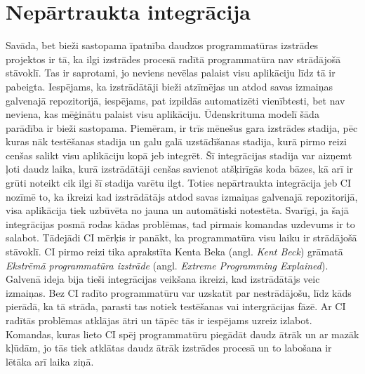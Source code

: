 \section{Nepārtraukta integrācija}
Savāda, bet bieži sastopama īpatnība daudzos programmatūras izstrādes projektos ir tā, ka ilgi izstrādes procesā radītā programmatūra nav strādājošā stāvoklī. Tas ir saprotami, jo neviens nevēlas palaist visu aplikāciju līdz tā ir pabeigta. Iespējams, ka izstrādātāji bieži atzīmējas un atdod savas izmaiņas galvenajā repozitorijā, iespējams, pat izpildās automatizēti vienībtesti, bet nav neviena, kas mēģinātu palaist visu aplikāciju. Ūdenskrituma modelī šāda parādība ir bieži sastopama. Piemēram, ir trīs mēnešus gara izstrādes stadija, pēc kuras nāk testēšanas stadija un galu galā uzstādīšanas stadija, kurā pirmo reizi cenšas salikt visu aplikāciju kopā jeb integrēt. Šī integrācijas stadija var aizņemt ļoti daudz laika, kurā izstrādātāji cenšas savienot atšķirīgās koda bāzes, kā arī ir grūti noteikt cik ilgi šī stadija varētu ilgt.
Toties nepārtraukta integrācija jeb CI  nozīmē to, ka ikreizi kad izstrādātājs atdod savas izmaiņas galvenajā repozitorijā, visa aplikācija tiek uzbūvēta no jauna un automātiski notestēta. Svarīgi, ja šajā integrācijas posmā rodas kādas problēmas, tad pirmais komandas uzdevums ir to salabot. Tādejādi CI mērķis ir panākt, ka programmatūra visu laiku ir strādājošā stāvoklī.
CI pirmo reizi tika aprakstīta Kenta Beka (angl. \textit{Kent Beck}) grāmatā \textit{Ekstrēmā programmatūra izstrāde} (angl. \textit{Extreme Programming Explained}). Galvenā ideja bija tieši integrācijas veikšana ikreizi, kad izstrādātājs veic izmaiņas. Bez CI radīto programmatūru var uzskatīt par nestrādājošu, līdz kāds pierādā, ka tā strāda, parasti tas notiek testēšanas vai intergrācijas fāzē. Ar CI radītās problēmas atklājas ātri un tāpēc tās ir iespējams uzreiz izlabot. Komandas, kuras lieto CI spēj programmatūru piegādāt daudz ātrāk un ar mazāk kļūdām, jo tās tiek atklātas daudz ātrāk izstrādes procesā un to labošana ir lētāka arī laika ziņā. \cite[3. nodaļa]{humble2010CD}
